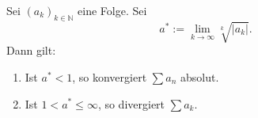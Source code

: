 Sei $(a_k)_{k \in \mathbb{N}}$ eine Folge. Sei 
$$a^* := \lim_{k \to \infty} \sqrt[k]{|a_k|}.$$
Dann gilt:
\begin{enumerate}[label=\alph*)]
    \item Ist $a^* < 1$, so konvergiert $\sum a_n$ absolut.
    \item Ist $1 < a^* \leq \infty$, so divergiert $\sum a_k$.
\end{enumerate}